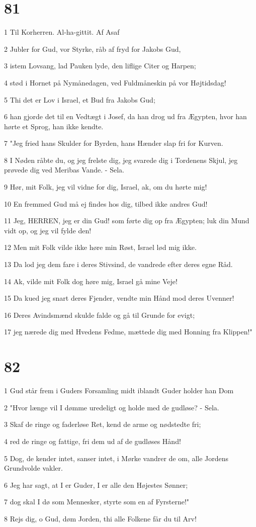 \chapter{81}

\par 1 Til Korherren. Al-ha-gittit. Af Asaf
\par 2 Jubler for Gud, vor Styrke, råb af fryd for Jakobs Gud,
\par 3 istem Lovsang, lad Pauken lyde, den liflige Citer og Harpen;
\par 4 stød i Hornet på Nymånedagen, ved Fuldmåneskin på vor Højtidsdag!
\par 5 Thi det er Lov i Israel, et Bud fra Jakobs Gud;
\par 6 han gjorde det til en Vedtægt i Josef, da han drog ud fra Ægypten, hvor han hørte et Sprog, han ikke kendte.
\par 7 "Jeg fried hans Skulder for Byrden, hans Hænder slap fri for Kurven.
\par 8 I Nøden råbte du, og jeg frelste dig, jeg svarede dig i Tordenens Skjul, jeg prøvede dig ved Meribas Vande. - Sela.
\par 9 Hør, mit Folk, jeg vil vidne for dig, Israel, ak, om du hørte mig!
\par 10 En fremmed Gud må ej findes hos dig, tilbed ikke andres Gud!
\par 11 Jeg, HERREN, jeg er din Gud! som førte dig op fra Ægypten; luk din Mund vidt op, og jeg vil fylde den!
\par 12 Men mit Folk vilde ikke høre min Røst, Israel lød mig ikke.
\par 13 Da lod jeg dem fare i deres Stivsind, de vandrede efter deres egne Råd.
\par 14 Ak, vilde mit Folk dog høre mig, Israel gå mine Veje!
\par 15 Da kued jeg snart deres Fjender, vendte min Hånd mod deres Uvenner!
\par 16 Deres Avindsmænd skulde falde og gå til Grunde for evigt;
\par 17 jeg nærede dig med Hvedens Fedme, mættede dig med Honning fra Klippen!"

\chapter{82}

\par 1 Gud står frem i Guders Forsamling midt iblandt Guder holder han Dom
\par 2 "Hvor længe vil I dømme uredeligt og holde med de gudløse? - Sela.
\par 3 Skaf de ringe og faderløse Ret, kend de arme og nødstedte fri;
\par 4 red de ringe og fattige, fri dem ud af de gudløses Hånd!
\par 5 Dog, de kender intet, sanser intet, i Mørke vandrer de om, alle Jordens Grundvolde vakler.
\par 6 Jeg har sagt, at I er Guder, I er alle den Højestes Sønner;
\par 7 dog skal I dø som Mennesker, styrte som en af Fyrsterne!"
\par 8 Rejs dig, o Gud, døm Jorden, thi alle Folkene får du til Arv!


